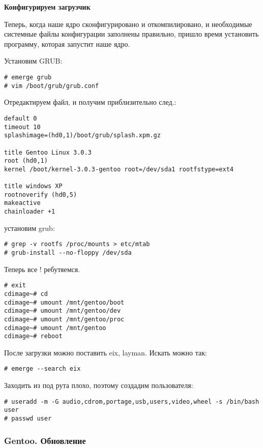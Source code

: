 \documentclass[12pt, a6paper]{article}
\begin{document}
{\bf Конфигурируем загрузчик}

Теперь, когда наше ядро сконфигурировано и откомпилировано, и необходимые системные файлы конфигурации заполнены правильно, пришло время установить программу, которая запустит наше ядро.

Установим GRUB:

\begin{verbatim}
# emerge grub
# vim /boot/grub/grub.conf
\end{verbatim}

Отредактируем файл, и получим приблизительно след.:

\begin{verbatim}
default 0
timeout 10
splashimage=(hd0,1)/boot/grub/splash.xpm.gz

title Gentoo Linux 3.0.3
root (hd0,1)
kernel /boot/kernel-3.0.3-gentoo root=/dev/sda1 rootfstype=ext4

title windows XP
rootnoverify (hd0,5)
makeactive
chainloader +1
\end{verbatim}

установим grub:

\begin{verbatim}
# grep -v rootfs /proc/mounts > etc/mtab
# grub-install --no-floppy /dev/sda
\end{verbatim}

Теперь все ! ребутяемся.

\begin{verbatim}
# exit 
cdimage~# cd 
cdimage~# umount /mnt/gentoo/boot   
cdimage~# umount /mnt/gentoo/dev 
cdimage~# umount /mnt/gentoo/proc 
cdimage~# umount /mnt/gentoo
cdimage~# reboot

\end{verbatim}

После загрузки можно поставить eix, layman.
Искать можно так:
\begin{verbatim}
# emerge --search eix
\end{verbatim}

Заходить из под рута плохо, поэтому создадим пользователя:
\begin{verbatim}
# useradd -m -G audio,cdrom,portage,usb,users,video,wheel -s /bin/bash user
# passwd user
\end{verbatim}

\subsubsection{Gentoo. Обновление}
\end{document}
